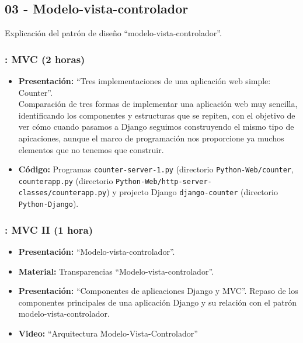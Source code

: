 \documentclass[a4paper,12pt]{article}
\begin{document}
\subsection{03 - Modelo-vista-controlador}

Explicación del patrón de diseño ``modelo-vista-controlador''.

\subsubsection{\martesG: MVC (2 horas)}
\label{cal:martesG}

\begin{itemize}
\item \textbf{Presentación:} ``Tres implementaciones de una aplicación web simple: Counter''. \\
  Comparación de tres formas de implementar una aplicación web muy sencilla, identificando los componentes y estructuras que se repiten, con el objetivo de ver cómo cuando pasamos a Django seguimos construyendo el mismo tipo de apicaciones, aunque el marco de programación nos proporcione ya muchos elementos que no tenemos que construir.
\item \textbf{Código:} Programas \verb|counter-server-1.py| (directorio \verb|Python-Web/counter|, \verb|counterapp.py| (directorio \verb|Python-Web/http-server-classes/counterapp.py|) y projecto Django \verb|django-counter| (directorio \verb|Python-Django|).
%

\end{itemize}

\subsubsection{\martesH: MVC II (1 hora)}
\label{cal:martesH}


\begin{itemize}
\item \textbf{Presentación:} ``Modelo-vista-controlador''.
\item \textbf{Material:} Transparencias ``Modelo-vista-controlador''.
\item \textbf{Presentación:} ``Componentes de aplicaciones Django y MVC''.
  Repaso de los componentes principales de una aplicación Django y su relación con el patrón modelo-vista-controlador.
\item \textbf{Video:} ``Arquitectura Modelo-Vista-Controlador''
\end{itemize}
\end{document}
